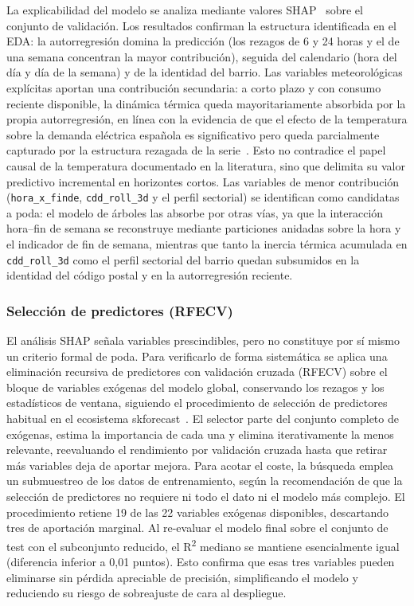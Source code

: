 \documentclass[12pt, a4paper]{article}
\begin{document}
La explicabilidad del modelo se analiza mediante valores SHAP~\cite{lundberg2017} sobre el conjunto de validación. Los resultados confirman la estructura identificada en el EDA: la autorregresión domina la predicción (los rezagos de 6 y 24 horas y el de una semana concentran la mayor contribución), seguida del calendario (hora del día y día de la semana) y de la identidad del barrio. Las variables meteorológicas explícitas aportan una contribución secundaria: a corto plazo y con consumo reciente disponible, la dinámica térmica queda mayoritariamente absorbida por la propia autorregresión, en línea con la evidencia de que el efecto de la temperatura sobre la demanda eléctrica española es significativo pero queda parcialmente capturado por la estructura rezagada de la serie~\cite{pardo2002}. Esto no contradice el papel causal de la temperatura documentado en la literatura, sino que delimita su valor predictivo incremental en horizontes cortos. Las variables de menor contribución (\texttt{hora\_x\_finde}, \texttt{cdd\_roll\_3d} y el perfil sectorial) se identifican como candidatas a poda: el modelo de árboles las absorbe por otras vías, ya que la interacción hora--fin de semana se reconstruye mediante particiones anidadas sobre la hora y el indicador de fin de semana, mientras que tanto la inercia térmica acumulada en \texttt{cdd\_roll\_3d} como el perfil sectorial del barrio quedan subsumidos en la identidad del código postal y en la autorregresión reciente.

\subsubsection{Selección de predictores (RFECV)}

El análisis SHAP señala variables prescindibles, pero no constituye por sí mismo un criterio formal de poda. Para verificarlo de forma sistemática se aplica una eliminación recursiva de predictores con validación cruzada (RFECV) sobre el bloque de variables exógenas del modelo global, conservando los rezagos y los estadísticos de ventana, siguiendo el procedimiento de selección de predictores habitual en el ecosistema skforecast~\cite{skforecast}. El selector parte del conjunto completo de exógenas, estima la importancia de cada una y elimina iterativamente la menos relevante, reevaluando el rendimiento por validación cruzada hasta que retirar más variables deja de aportar mejora. Para acotar el coste, la búsqueda emplea un submuestreo de los datos de entrenamiento, según la recomendación de que la selección de predictores no requiere ni todo el dato ni el modelo más complejo. El procedimiento retiene 19 de las 22 variables exógenas disponibles, descartando tres de aportación marginal. Al re-evaluar el modelo final sobre el conjunto de test con el subconjunto reducido, el R\textsuperscript{2} mediano se mantiene esencialmente igual (diferencia inferior a 0,01 puntos). Esto confirma que esas tres variables pueden eliminarse sin pérdida apreciable de precisión, simplificando el modelo y reduciendo su riesgo de sobreajuste de cara al despliegue.
\end{document}
